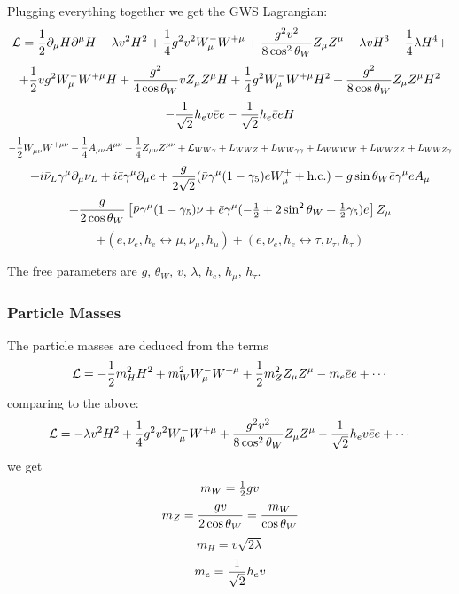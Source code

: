 Plugging everything together we get the GWS Lagrangian: 
\begin{equation*}
  {\mathcal L} = {1\over2}\partial_\mu H\partial^\mu H - \lambda v^2 H^2 +{1\over4}g^2v^2W^-_\mu W^{+\mu}+{g^2v^2\over8\cos^2\theta_W}Z_\mu Z^\mu - \lambda v H^3 - {1\over 4}\lambda H^4 +
\end{equation*}
\begin{equation*}
  +{1\over2}vg^2W_\mu^-W^{+\mu}H +{g^2\over4\cos\theta_W}vZ_\mu Z^\mu H +{1\over4}g^2W_\mu^-W^{+\mu}H^2 +{g^2\over8\cos\theta_W}Z_\mu Z^\mu H^2
\end{equation*}
\begin{equation*}
  -{1\over\sqrt2}h_ev\bar ee-{1\over\sqrt2}h_e\bar eeH
\end{equation*}
\begin{equation*}
  -{1\over2}W^-_{\mu\nu}W^{+\mu\nu} -{1\over4}A_{\mu\nu}A^{\mu\nu} -{1\over4}Z_{\mu\nu}Z^{\mu\nu} +{\mathcal L}_{WW\gamma}+L_{WWZ}+L_{WW\gamma\gamma}+L_{WWWW}+L_{WWZZ}+L_{WWZ\gamma}
\end{equation*}
\begin{equation*}
  +i\bar\nu_L\gamma^\mu\partial_\mu\nu_L+i\bar e \gamma^\mu\partial_\mu e +{g\over2\sqrt2}(\bar \nu\gamma^\mu (1-\gamma_5) e W^+_\mu + \hbox{h.c.}) -g\sin\theta_W\bar e\gamma^\mu e A_\mu
\end{equation*}
\begin{equation*}
  +{g\over2\cos\theta_W}\left[ \bar\nu\gamma^\mu(1-\gamma_5)\nu +\bar e\gamma^\mu (-{\textstyle{1\over2}}+2\sin^2\theta_W+{\textstyle{1\over2}}\gamma_5) e \right]Z_\mu
\end{equation*}
\begin{equation*}
  + (e, \nu_e, h_e \leftrightarrow \mu, \nu_\mu, h_\mu) + (e, \nu_e, h_e \leftrightarrow \tau, \nu_\tau, h_\tau)
\end{equation*}

The free parameters are $g$, $\theta_W$, $v$, $\lambda$, $h_e$, $h_\mu$, $h_\tau$.

\subsubsection{Particle Masses}

The particle masses are deduced from the terms 
\begin{equation*}
  {\mathcal L} = -{1\over2}m_H^2 H^2 +m_W^2 W^-_\mu W^{+\mu} +{1\over2}m_Z^2 Z_\mu Z^\mu -m_e\bar ee +\cdots
\end{equation*}
comparing to the above: 
\begin{equation*}
  {\mathcal L} = -\lambda v^2 H^2 +{1\over4}g^2v^2W^-_\mu W^{+\mu} +{g^2v^2\over8\cos^2\theta_W}Z_\mu Z^\mu -{1\over\sqrt2}h_ev\bar ee +\cdots
\end{equation*}
we get 
\begin{equation*}
  m_W = {\textstyle{1\over2}} g v
\end{equation*}
\begin{equation*}
  m_Z = {gv\over2\cos\theta_W}={m_W\over\cos\theta_W}
\end{equation*}
\begin{equation*}
  m_H = v\sqrt{2\lambda}
\end{equation*}
\begin{equation*}
  m_e = {1\over\sqrt2}h_ev
\end{equation*}


